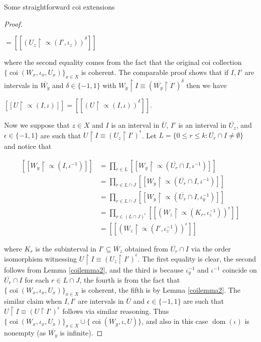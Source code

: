 \documentclass{amsart}
\theoremstyle{definition}\newtheorem{theorem}{Theorem}
\theoremstyle{definition}\newtheorem*{A}{Main Theorem}
\theoremstyle{definition}\newtheorem*{B}{Theorem \ref{elementaryequiv}}
\theoremstyle{definition}\newtheorem*{C}{Theorem \ref{continuous}}
\theoremstyle{definition}\newtheorem*{D}{Theorem \ref{bigisomorphism2}}
\theoremstyle{definition}\newtheorem{bigtheorem}{Main Theorem}
\numberwithin{theorem}{section}
\theoremstyle{definition}\newtheorem{corollary}[theorem]{Corollary}
\theoremstyle{definition}\newtheorem{proposition}[theorem]{Proposition}
\theoremstyle{definition}\newtheorem{definition}[theorem]{Definition}
\theoremstyle{definition}\newtheorem{question}[theorem]{Question}
\theoremstyle{definition}\newtheorem{example}[theorem]{Example}
\theoremstyle{definition}\newtheorem{remark}[theorem]{Remark}
\theoremstyle{definition}\newtheorem{note}[theorem]{Note}
\theoremstyle{definition}\newtheorem{lemma}[theorem]{Lemma}
\theoremstyle{definition}\newtheorem{fact}[theorem]{Fact}
\theoremstyle{definition}\newtheorem{define}[theorem]{Definition}
\theoremstyle{definition}\newtheorem{claim}[theorem]{Claim}
\theoremstyle{definition}\newtheorem{obs}[theorem]{Observation}
\theoremstyle{definition}\newtheorem{definitions}[theorem]{Definitions}
\newcommand{\coi}{\operatorname{coi}}
\newcommand{\dom}{\operatorname{dom}}
\begin{document}
\begin{section}{Some straightforward coi extensions}
\begin{proof}
\begin{center}
$= [[(U_z \upharpoonright \varpropto(I', \iota_z))^{\delta}]]$

\end{center}

\noindent where the second equality comes from the fact that the original coi collection $\{\coi(W_x, \iota_x, U_x)\}_{x\in X}$ is coherent.  The comparable proof shows that if $I, I'$ are intervals in $\overline{W_y}$ and $\delta \in \{-1, 1\}$ with $W_y \upharpoonright I \equiv (W_y \upharpoonright I')^{\delta}$ then we have

\begin{center}
$[[U \upharpoonright \varpropto(I, \iota)]] = [[(U \upharpoonright \varpropto(I, \iota))^{\delta}]]$.
\end{center}

Now we suppose that $z\in X$ and $I$ is an interval in $\overline{U}$, $I'$ is an interval in $\overline{U_z}$, and $\epsilon \in \{-1, 1\}$ are such that $U \upharpoonright I \equiv (U_z \upharpoonright I')^{\epsilon}$.  Let $L = \{0 \leq r \leq k: \overline{U_r} \cap I \neq \emptyset\}$ and notice that




$$
\begin{array}{ll}
[[W_y \upharpoonright \varpropto(I, \iota^{-1})]] & = \prod_{r \in L} [[W_y \upharpoonright \varpropto(\overline{U_r} \cap I, \iota^{-1})]]\\
& = \prod_{r \in L \cap J} [[W_y \upharpoonright \varpropto(\overline{U_r} \cap I, \iota^{-1})]]\\
& = \prod_{r \in L \cap J} [[W_y \upharpoonright \varpropto(\overline{U_r} \cap I, \iota_y^{-1})]]\\
& = \prod_{r \in (L \cap J)^{\epsilon}} [[(W_z \upharpoonright \varpropto(K_r,\iota_z^{-1}))^{\epsilon}]]\\
& = [[(W_z \upharpoonright \varpropto(I', \iota_z^{-1}))^{\epsilon}]]



\end{array}
$$

\noindent where $K_r$ is the subinterval in $I' \subseteq \overline{W_z}$ obtained from $\overline{U_r} \cap I$ via the order isomorphism witnessing $U \upharpoonright I \equiv (U_z \upharpoonright I')^{\epsilon}$.  The first equality is clear, the second follows from Lemma \ref{coilemma2}, and the third is because $\iota_y^{-1}$ and $\iota^{-1}$ coincide on $\overline{U_r} \cap I$ for each $r \in L \cap J$, the fourth is from the fact that $\{\coi(W_x, \iota_x, U_x)\}_{x\in X}$ is coherent, the fifth is by Lemma \ref{coilemma2}.  The similar claim when $I, I'$ are intervals in $\overline{U}$ and $\epsilon \in \{-1, 1\}$ are such that $U\upharpoonright I \equiv (U \upharpoonright I')^{\epsilon}$ follows via similar reasoning.  Thus $\{\coi(W_x, \iota_x, U_x)\}_{x\in X} \cup \{\coi(W_y, \iota, U)\}$, and also in this case $\dom(\iota)$ is nonempty (as $\overline{W_y}$ is infinite).
\end{proof}


\end{section}
\end{document}

